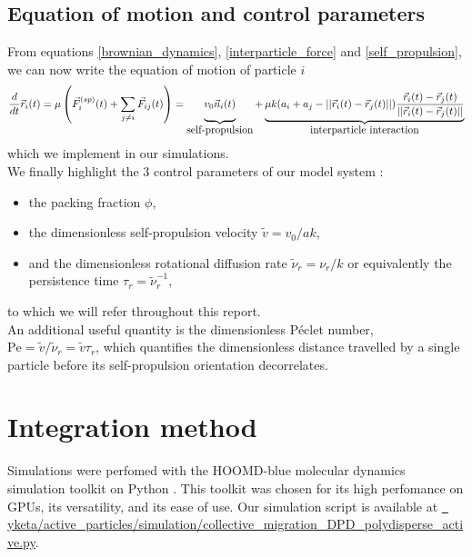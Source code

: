 \documentclass[class=report, float=false, crop=false]{standalone}
\begin{document}
\subsection{Equation of motion and control parameters}

From equations \ref{brownian_dynamics}, \ref{interparticle_force} and \ref{self_propulsion}, we can now write the equation of motion of particle $i$
\begin{equation}
\frac{d}{dt}\vec{r}_i(t) = \mu\left(\vec{F}_i^{(sp)}(t) + \sum_{j \neq i} \vec{F}_{ij}(t)\right) = \underbrace{v_0\vec{n}_i(t)\vphantom{\frac{\vec{r}_i(t) - \vec{r}_j(t)}{||\vec{r}_i(t) - \vec{r}_j(t)||}}}_{\displaystyle\text{self-propulsion}} + \underbrace{\mu k (a_i + a_j - ||\vec{r}_i(t) - \vec{r}_j(t)||)\frac{\vec{r}_i(t) - \vec{r}_j(t)}{||\vec{r}_i(t) - \vec{r}_j(t)||}}_{\displaystyle\text{interparticle interaction}}
\label{equation_motion}
\end{equation}
which we implement in our simulations.\\

We finally highlight the 3 control parameters of our model system \cite{fily2014freezing}:
\begin{itemize}
\item the packing fraction $\phi$,
\item the dimensionless self-propulsion velocity $\tilde{v} = v_0/ak$,
\item and the dimensionless rotational diffusion rate $\tilde{\nu}_r = \nu_r/k$ or equivalently the persistence time $\tau_r = \tilde{\nu}_r^{-1}$,
\end{itemize}
to which we will refer throughout this report.\\

An additional useful quantity is the dimensionless P\'eclet number, $\text{Pe} = \tilde{v}/\tilde{\nu}_r = \tilde{v}\tau_r$, which quantifies the dimensionless distance travelled by a single particle before its self-propulsion orientation decorrelates.

\section{Integration method}

Simulations were perfomed with the HOOMD-blue molecular dynamics simulation toolkit \cite{hoomd, anderson2008general, glaser2015strong, phillips2011pseudo} on Python \faPython. This toolkit was chosen for its high perfomance on GPUs, its versatility, and its ease of use. Our simulation script is available at \href{https://github.com/yketa/active_particles/blob/master/simulation/collective_migration_DPD_polydisperse_active.py}{{\faGithub~ yketa/active\_particles/simulation/collective\_migration\_DPD\_polydisperse\_active.py}}.
\end{document}
